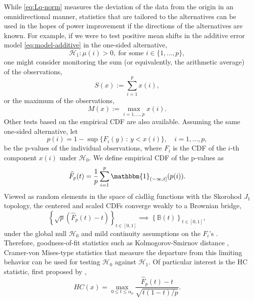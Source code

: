 While \eqref{eq:Lq-norm} measures the deviation of the data from the origin in an omnidirectional manner, statistics that are tailored to the alternatives can be used in the hopes of power improvement if the directions of the alternatives are known.
For example, if we were to test positive mean shifts in the additive error model \eqref{eq:model-additive} in the one-sided alternative,
\begin{equation} \label{eq:global-test-one-sided}
    \mathcal{H}_1: \mu(i)> 0, \; \text{for some }i\in\{1,\ldots,p\},
\end{equation}
one might consider monitoring the sum (or equivalently, the arithmetic average) of the observations, 
\begin{equation} \label{eq:sum-statistic}
    S(x) := \sum_{i=1}^p{x(i)},
\end{equation}
or the maximum of the observations,
\begin{equation} \label{eq:max-statistic}
    M(x) := \max_{i=1,\ldots,p}{x(i)}.
\end{equation}
Other tests based on the empirical \ac{CDF} are also available.
Assuming the same one-sided alternative, let 
\begin{equation}
    p(i) = 1 - \sup\{F_i(y)\,:\,y<x(i)\}, \quad i = 1,\ldots,p,
\end{equation}
be the p-values of the individual observations, where $F_i$ is the \ac{CDF} of the $i$-th component $x(i)$ under $\mathcal{H}_0$.
We define empirical \ac{CDF} of the p-values as
\begin{equation}
    \widehat{F}_p(t) = 
    \frac{1}{p} \sum_{i=1}^p \mathbbm{1}_{(-\infty, t]}(p(i)).
\end{equation}
Viewed as random elements in the space of c\`adl\`ag functions with the Skorohod $J_1$ topology, the centered and scaled \ac{CDF}s converge weakly to a Brownian bridge,
\begin{equation*}
    \left\{\sqrt{p}\left(\widehat{F}_p(t) - t\right)\right\}_{t\in[0,1]} 
    \implies
    \left\{\mathbb{B}(t)\right\}_{t\in[0,1]},
\end{equation*}
under the global null $\mathcal{H}_0$ and mild continuity assumptions on the $F_i$'s \citep{skorokhod1956limit}. 
Therefore, goodness-of-fit statistics such as Kolmogorov-Smirnov distance \citep{smirnov1948table}, Cramer-von Mises-type statistics \citep{cramer1928composition, anderson1952asymptotic} that measure the departure from this limiting behavior can be used for testing $\mathcal{H}_0$ against $\mathcal{H}_1$.
Of particular interest is the \ac{HC} statistic, first proposed by \cite{tukey1976lecture},
\begin{equation*} %
    HC(x) = 
    \max_{0\le t\le\alpha_0}\frac{\widehat{F}_p(t) - t}{\sqrt{t(1 - t)/p}}.
\end{equation*}

